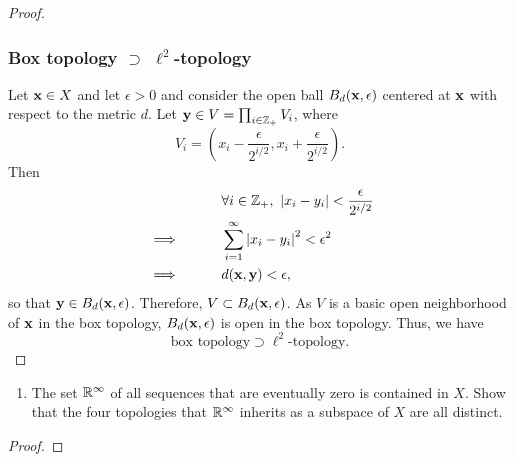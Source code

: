 \begin{solution}
\begin{proof}
    \subsubsection*{Box topology $\supset$ $\ell^2$-topology}
    Let $\mathbf{x} \in X$ and let $\epsilon > 0$ and consider the open ball $B_d(\mathbf{x}, \epsilon)$ centered at $\mathbf{x}$ with respect to the metric $d$.
    Let $\mathbf{y} \in V = \prod_{i \in \mathbb{Z}_+} V_i$, where
    \begin{equation*}
      V_i = (x_i - \frac{\epsilon}{2^{i/2}}, x_i + \frac{\epsilon}{2^{i/2}}).
    \end{equation*}
    Then
    \begin{alignat*}{2}
      &           && \qquad \forall i \in \mathbb{Z}_+,~ \left| x_i - y_i \right| < \frac{\epsilon}{2^{i/2}} \\
      & \implies  && \qquad \sum_{i=1}^\infty \left| x_i - y_i \right|^2 < \epsilon^2 \\
      & \implies  && \qquad d(\mathbf{x}, \mathbf{y}) < \epsilon,
    \end{alignat*}
    so that $\mathbf{y} \in B_d(\mathbf{x}, \epsilon)$.
    Therefore, $V \subset B_d(\mathbf{x}, \epsilon)$.
    As $V$ is a basic open neighborhood of $\mathbf{x}$ in the box topology, $B_d(\mathbf{x}, \epsilon)$ is open in the box topology.
    Thus, we have
    \begin{equation*}
      \text{box topology} \supset \ell^2\text{-topology}.
    \end{equation*}
  \end{proof}
  \bigskip

  \begin{enumerate}[label={(\alph*)}, align=left, leftmargin=\parindent, listparindent=\parindent, labelwidth=0pt, itemindent=!]
    \addtocounter{enumi}{1} 
    \item
      The set $\mathbb{R}^\infty$ of all sequences that are eventually zero is contained in $X$.
      Show that the four topologies that $\mathbb{R}^\infty$ inherits as a subspace of $X$ are all distinct.
  \end{enumerate}
  \begin{proof}
  \end{proof}
\end{solution}
\newpage

